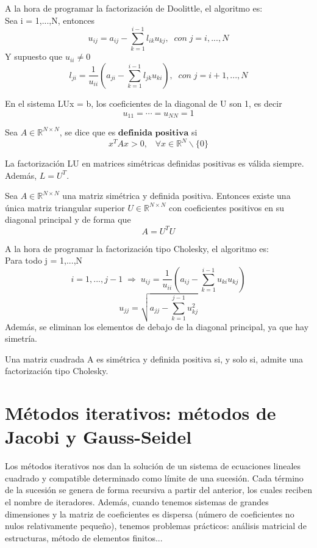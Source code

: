 A la hora de programar la factorización de Doolittle, el algoritmo es:\\
Sea i = 1,...,N, entonces
\[ u_{ij} = a_{ij} - \sum_{k=1}^{i-1} l_{ik}u_{kj}, \; \; con \; j = i,...,N \]
Y supuesto que $u_{ii} \neq 0$
\[ l_{ji} = \frac{1}{u_{ii}} \left( a_{ji} - \sum_{k=1}^{i-1} l_{jk}u_{ki} \right), \; \; con \; j = i+1,...,N \]

\begin{ndef}
En el sistema LUx = b, los coeficientes de la diagonal de U son 1, es decir
\[ u_{11} = \cdots = u_{NN} = 1 \]
\end{ndef}

\begin{ndef}
Sea $A \in \mathbb{R}^{N \times N}$, se dice que es $\textbf{definida positiva}$ si
\[ x^TAx > 0, \; \; \; \forall x \in \mathbb{R}^N \backslash \lbrace 0 \rbrace \]
\end{ndef}

La factorización LU en matrices simétricas definidas positivas es válida siempre. Además, $L = U^T$.

\begin{ndef}
Sea $A \in \mathbb{R}^{N \times N}$ una matriz simétrica y definida positiva. Entonces existe una única matriz triangular superior $U \in \mathbb{R}^{N \times N}$ con coeficientes positivos en su diagonal principal y de forma que
\[ A = U^TU \]
\end{ndef}

A la hora de programar la factorización tipo Cholesky, el algoritmo es:\\
Para todo j = 1,...,N
\[ i = 1,...,j-1 \; \Rightarrow \; u_{ij} = \frac{1}{u_{ii}} \left( a_{ij} - \sum_{k=1}^{i-1} u_{ki}u_{kj} \right) \]
\[ u_{jj} = \sqrt{a_{jj} - \sum_{k=1}^{j-1}u_{kj}^2} \]
Además, se eliminan los elementos de debajo de la diagonal principal, ya que hay simetría.

\begin{nprop}
Una matriz cuadrada A es simétrica y definida positiva si, y solo si, admite una factorización tipo Cholesky.
\end{nprop}

\section{Métodos iterativos: métodos de Jacobi y Gauss-Seidel}
Los métodos iterativos nos dan la solución de un sistema de ecuaciones lineales cuadrado y compatible determinado como límite de una sucesión. Cada término de la sucesión se genera de forma recursiva a partir del anterior, los cuales reciben el nombre de iteradores. Además, cuando tenemos sistemas de grandes dimensiones y la matriz de coeficientes es dispersa (número de coeficientes no nulos relativamente pequeño), tenemos problemas prácticos: análisis matricial de estructuras, método de elementos finitos...

